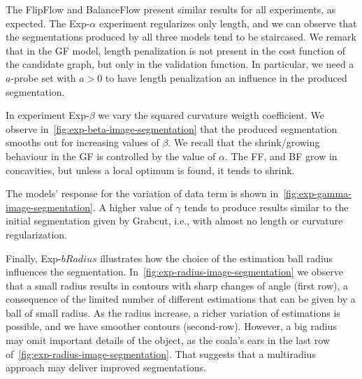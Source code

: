 The FlipFlow and BalanceFlow present similar results for all experiments, as expected. The Exp-$\alpha$ experiment regularizes only length, and we can observe that the segmentations produced by all three models tend to be staircased. We remark that in the GF model, length penalization is not present in the cost function of the candidate graph, but only in the validation function. In particular, we need  a $a$-probe set with $a>0$ to have length penalization an influence in the produced segmentation.

In experiment Exp-$\beta$ we vary the squared curvature weigth coefficient. We observe in~\cref{fig:exp-beta-image-segmentation} that the produced segmentation smooths out for increasing values of $\beta$. We recall that the shrink/growing behaviour in the GF is controlled by the value of $\alpha$. The FF, and BF grow in concavities, but unless a local optimum is found, it tends to shrink.

The models' response for the variation of data term is shown in~\cref{fig:exp-gamma-image-segmentation}. A higher value of $\gamma$ tends to produce results similar to the initial segmentation given by Grabcut, i.e., with almost no length or curvature regularization.

Finally, Exp-$bRadius$ illustrates how the choice of the estimation ball radius influences the segmentation. In~\cref{fig:exp-radius-image-segmentation} we observe that a small radius results in contours with sharp changes of angle (first row), a consequence of the limited number of different estimations that can be given by a ball of small radius. As the radius increase, a richer variation of estimations is possible, and we have smoother contours (second-row). However, a big radius may omit important details of the object, as the coala's ears in the last row of~\cref{fig:exp-radius-image-segmentation}. That suggests that a multiradius approach may deliver improved segmentations.


